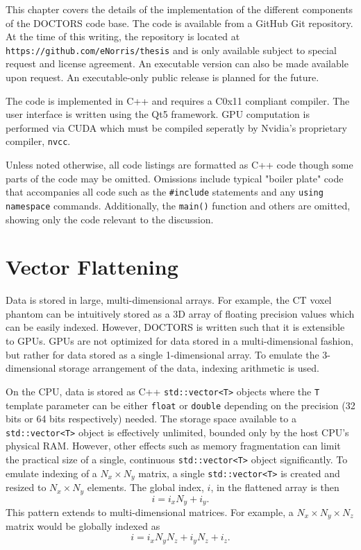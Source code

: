 
This chapter covers the details of the implementation of the different components of the DOCTORS code base. The code is available from a GitHub Git repository. At the time of this writing, the repository is located at \texttt{https://github.com/eNorris/thesis} and is only available subject to special request and license agreement. An executable version can also be made available upon request. An executable-only public release is planned for the future.

The code is implemented in C++ and requires a C0x11 compliant compiler. The user interface is written using the Qt5 framework. GPU computation is performed via CUDA which must be compiled seperatly by Nvidia's proprietary compiler, \texttt{nvcc}.

Unless noted otherwise, all code listings are formatted as C++ code though some parts of the code may be omitted. Omissions include typical "boiler plate" code that accompanies all code such as the \texttt{\#include} statements and any \texttt{using namespace} commands. Additionally, the \texttt{main()} function and others are omitted, showing only the code relevant to the discussion.

\section{Vector Flattening}\label{sec:flatten}

Data is stored in large, multi-dimensional arrays. For example, the CT voxel phantom can be intuitively stored as a 3D array of floating precision values which can be easily indexed. However, DOCTORS is written such that it is extensible to GPUs. GPUs are not optimized for data stored in a multi-dimensional fashion, but rather for data stored as a single 1-dimensional array. To emulate the 3-dimensional storage arrangement of the data, indexing arithmetic is used.

On the CPU, data is stored as C++ \texttt{std::vector<T>} objects where the \texttt{T} template parameter can be either \texttt{float} or \texttt{double} depending on the precision (32 bits or 64 bits respectively) needed. The storage space available to a \texttt{std::vector<T>} object is effectively unlimited, bounded only by the host CPU's physical RAM. However, other effects such as memory fragmentation can limit the practical size of a single, continuous \texttt{std::vector<T>} object significantly. To emulate indexing of a $N_x \times N_y$ matrix, a single \texttt{std::vector<T>} is created and resized to $N_x \times N_y$ elements. The global index, $i$, in the flattened array is then
\begin{equation}
i = i_x N_y + i_y.
\end{equation}
This pattern extends to multi-dimensional matrices. For example, a $N_x \times N_y \times N_z$ matrix would be globally indexed as
\begin{equation}
i = i_x N_y N_z + i_y N_z + i_z.
\end{equation}

